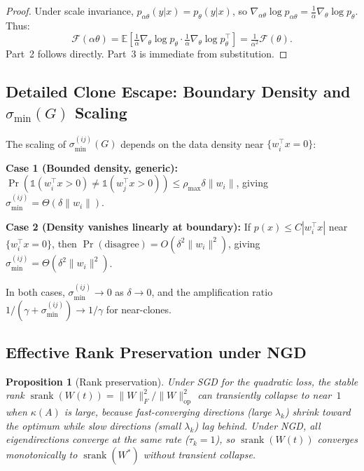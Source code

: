 \documentclass{article}
\providecommand{\E}{\mathbb{E}}
\providecommand{\FIM}{\mathcal{F}}
\providecommand{\norm}[1]{\lVert #1 \rVert}
\DeclareMathOperator{\srank}{srank}
\theoremstyle{plain}
\newtheorem{proposition}{Proposition}
\theoremstyle{definition}
\theoremstyle{remark}
\begin{document}
\begin{proof}
Under scale invariance, $p_{\alpha\theta}(y|x) = p_\theta(y|x)$, so $\nabla_{\alpha\theta}\log p_{\alpha\theta} = \frac{1}{\alpha}\nabla_\theta \log p_\theta$. Thus:
\begin{equation}
    \FIM(\alpha\theta) = \E\!\left[\tfrac{1}{\alpha}\nabla_\theta\log p_\theta \cdot \tfrac{1}{\alpha}\nabla_\theta\log p_\theta^\top\right] = \tfrac{1}{\alpha^2}\FIM(\theta).
\end{equation}
Part~2 follows directly. Part~3 is immediate from substitution.
\end{proof}

\subsection{Detailed Clone Escape: Boundary Density and $\sigma_{\min}(G)$ Scaling}
\label{app:clone_detail}

The scaling of $\sigma_{\min}^{(ij)}(G)$ depends on the data density near $\{w_i^\top x = 0\}$:

\textbf{Case 1 (Bounded density, generic):} $\Pr(\mathbb{1}(w_i^\top x > 0) \neq \mathbb{1}(w_j^\top x > 0)) \leq \rho_{\max}\delta\norm{w_i}$, giving $\sigma_{\min}^{(ij)} = \Theta(\delta\norm{w_i})$.

\textbf{Case 2 (Density vanishes linearly at boundary):} If $p(x) \leq C|w_i^\top x|$ near $\{w_i^\top x = 0\}$, then $\Pr(\text{disagree}) = O(\delta^2\norm{w_i}^2)$, giving $\sigma_{\min}^{(ij)} = \Theta(\delta^2\norm{w_i}^2)$.

In both cases, $\sigma_{\min}^{(ij)} \to 0$ as $\delta \to 0$, and the amplification ratio $1/(\gamma + \sigma_{\min}^{(ij)}) \to 1/\gamma$ for near-clones.

\subsection{Effective Rank Preservation under NGD}

\begin{proposition}[Rank preservation]
Under SGD for the quadratic loss, the stable rank $\srank(W(t)) = \norm{W}_F^2/\norm{W}_{\mathrm{op}}^2$ can transiently collapse to near~$1$ when $\kappa(A)$ is large, because fast-converging directions (large $\lambda_k$) shrink toward the optimum while slow directions (small $\lambda_k$) lag behind. Under NGD, all eigendirections converge at the same rate ($\tau_k = 1$), so $\srank(W(t))$ converges monotonically to $\srank(W^*)$ without transient collapse.
\end{proposition}
\end{document}
